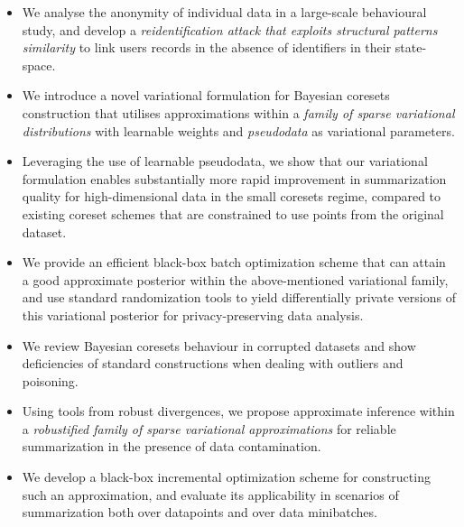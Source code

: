 \begin{itemize}
	\item We analyse the anonymity of individual data in a large-scale behavioural study, and develop a \emph{reidentification attack that exploits structural patterns similarity} to link users records in the absence of identifiers in their state-space.
	\item We introduce a novel variational formulation for Bayesian coresets construction that utilises approximations within a \emph{family of sparse variational distributions} with learnable weights and \emph{pseudodata} as variational parameters.
	\item Leveraging the use of learnable pseudodata, we show that our variational formulation enables substantially more rapid improvement in summarization quality for high-dimensional data in the small coresets regime, compared to existing coreset schemes that are constrained to use points from the original dataset. 
	\item We provide an efficient black-box batch optimization scheme that can attain a good approximate posterior within the above-mentioned variational family, and use standard randomization tools to yield differentially private versions of this variational posterior for privacy-preserving data analysis.
	\item We review Bayesian coresets behaviour in corrupted datasets and show deficiencies of standard constructions when dealing with outliers and poisoning.
	\item Using tools from robust divergences, we propose approximate inference within a \emph{robustified family of sparse variational approximations} for reliable summarization in the presence of data contamination.
	\item We develop a black-box incremental optimization scheme for constructing such an approximation, and evaluate its applicability in scenarios of summarization both over datapoints and over data minibatches.
\end{itemize}

